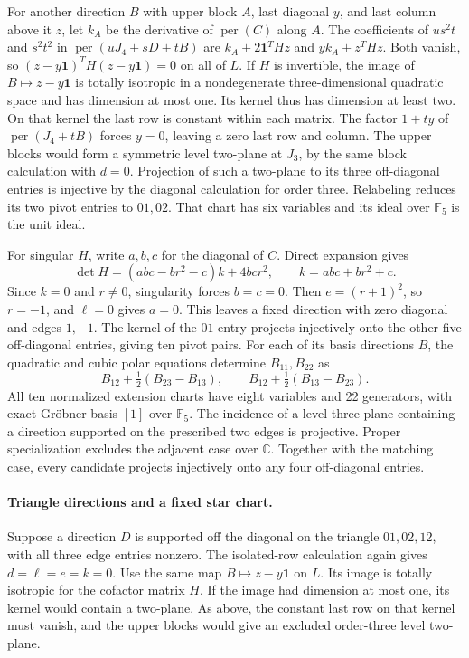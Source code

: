 For another direction \(B\) with upper block \(A\), last diagonal
\(y\), and last column above it \(z\), let \(k_A\) be the derivative
of \(\operatorname{per}(C)\) along \(A\).
The coefficients of \(us^2t\) and \(s^2t^2\) in
\(\operatorname{per}(uJ_4+sD+tB)\) are
\(k_A+2\mathbf1^THz\) and \(yk_A+z^THz\).
Both vanish, so \((z-y\mathbf1)^TH(z-y\mathbf1)=0\) on all of \(L\).
If \(H\) is invertible, the image of \(B\mapsto z-y\mathbf1\)
is totally isotropic in a nondegenerate three-dimensional quadratic
space and has dimension at most one. Its kernel thus has dimension
at least two. On that kernel the last row is constant within each
matrix. The factor \(1+ty\) of \(\operatorname{per}(J_4+tB)\)
forces \(y=0\), leaving a zero last row and column.
The upper blocks would form a symmetric level two-plane at \(J_3\),
by the same block calculation with \(d=0\).
Projection of such a two-plane to its three off-diagonal entries is
injective by the diagonal calculation for order three. Relabeling
reduces its two pivot entries to \(01,02\). That chart has six
variables and its ideal over \(\mathbb F_5\) is the unit ideal.

For singular \(H\), write \(a,b,c\) for the diagonal of \(C\).
Direct expansion gives
\[
 \det H=(abc-br^2-c)k+4bcr^2,
 \qquad k=abc+br^2+c.
\]
Since \(k=0\) and \(r\ne0\), singularity forces \(b=c=0\).
Then \(e=(r+1)^2\), so \(r=-1\), and \(\ell=0\) gives \(a=0\).
This leaves a fixed direction with zero diagonal and edges \(1,-1\).
The kernel of the \(01\) entry projects injectively onto the other
five off-diagonal entries, giving ten pivot pairs. For each of its
basis directions \(B\), the quadratic and cubic polar equations
determine \(B_{11},B_{22}\) as
\[
 B_{12}+\tfrac12(B_{23}-B_{13}),
 \qquad B_{12}+\tfrac12(B_{13}-B_{23}).
\]
All ten normalized extension charts have eight variables and
22 generators, with exact Gr\"obner basis \([1]\) over
\(\mathbb F_5\). The incidence of a level three-plane containing a
direction supported on the prescribed two edges is projective.
Proper specialization excludes the adjacent case over \(\mathbb C\).
Together with the matching case, every candidate projects injectively
onto any four off-diagonal entries.

\paragraph{Triangle directions and a fixed star chart.}
Suppose a direction \(D\) is supported off the diagonal on the
triangle \(01,02,12\), with all three edge entries nonzero.
The isolated-row calculation again gives \(d=\ell=e=k=0\).
Use the same map \(B\mapsto z-y\mathbf1\) on \(L\).
Its image is totally isotropic for the cofactor matrix \(H\).
If the image had dimension at most one, its kernel would contain
a two-plane. As above, the constant last row on that kernel must
vanish, and the upper blocks would give an excluded order-three
level two-plane.


